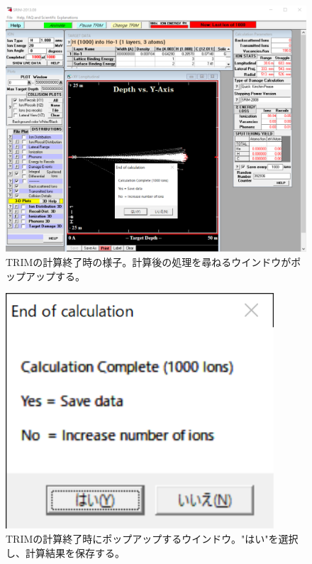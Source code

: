 \documentclass [11pt,a4paper,dvipdfmx] {jarticle}
\begin{document}
\begin{figure}[H]
    \centering
    \includegraphics[width=12cm]{./pic/TRIM_calc_end.jpg}
    \caption{TRIMの計算終了時の様子。計算後の処理を尋ねるウインドウがポップアップする。}
    \label{fig:TRIM_calc_end}
\end{figure}


\begin{figure}[H]
    \centering
    \includegraphics[width=10cm]{./pic/TRIM_save.jpg}
    \caption{TRIMの計算終了時にポップアップするウインドウ。"はい"を選択し、計算結果を保存する。}
    \label{fig:TRIM_save}
\end{figure}
\end{document}
